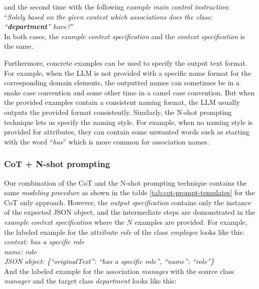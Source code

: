 \noindent{}and the second time with the following \emph{example main control instruction}: \\

\noindent{}``\textit{Solely based on the given context which associations does the class: ``\textbf{department}'' have?}'' \\

\noindent{}In both cases, the \emph{example context specification} and the \emph{context specification} is the same.

Furthermore, concrete examples can be used to specify the output text format. For example, when the LLM is not provided with a specific name format for the corresponding domain elements, the outputted names can sometimes be in a snake case convention and some other time in a camel case convention. But when the provided examples contain a consistent naming format, the LLM usually outputs the provided format consistently. Similarly, the N-shot prompting technique lets us specify the naming style. For example, when no naming style is provided for attributes, they can contain some unwanted words such as starting with the word ``\textit{has}'' which is more common for association names.


\subsubsection{CoT + N-shot prompting}

Our combination of the CoT and the N-shot prompting technique contains the same \emph{modeling procedure} as shown in the table \ref{tab:cot-prompt-templates} for the CoT only approach. However, the \emph{output specification} contains only the instance of the expected JSON object, and the intermediate steps are demonstrated in the \emph{example context specification} where the $N$ examples are provided. For example, the labeled example for the attribute \textit{role} of the class \textit{employee} looks like this: \\

\noindent{}\textit{context: has a specific role} \\
\textit{name: role} \\
\textit{JSON object: \{``originalText'': ``has a specific role'', ``name'': ``role''\}} \\

\noindent{}And the labeled example for the association \textit{manages} with the source class \textit{manager} and the target class \textit{department} looks like this: \\

